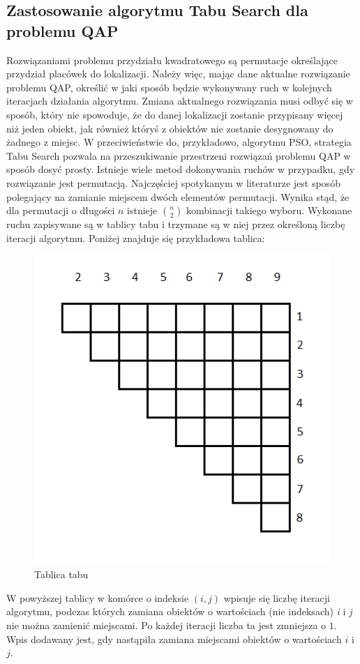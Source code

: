 \subsection{Zastosowanie algorytmu Tabu Search dla problemu QAP}
Rozwiązaniami problemu przydziału kwadratowego są permutacje określające przydział placówek do lokalizacji. Należy więc, mając dane aktualne rozwiązanie problemu QAP, określić w jaki sposób będzie wykonywany ruch w kolejnych iteracjach działania algorytmu. Zmiana aktualnego rozwiązania musi odbyć się w sposób, który nie spowoduje, że do danej lokalizacji zostanie przypisany więcej niż jeden obiekt, jak również któryś z obiektów nie zostanie desygnowany do żadnego z miejsc. W przeciwieństwie do, przykładowo, algorytmu PSO, strategia Tabu Search pozwala na przeszukiwanie przestrzeni rozwiązań problemu QAP w sposób dosyć prosty. Istnieje wiele metod dokonywania ruchów w przypadku, gdy rozwiązanie jest permutacją. Najczęściej spotykanym w literaturze jest sposób polegający na zamianie miejscem dwóch elementów permutacji. Wynika stąd, że dla permutacji o długości $n$ istnieje $n\choose 2$ kombinacji takiego wyboru. Wykonane ruchu zapisywane są w tablicy tabu i trzymane są w niej przez określoną liczbę iteracji algorytmu. Poniżej znajduje się przykładowa tablica:
\newpage
\begin{figure}[h]
\begin{center}
\includegraphics[scale=0.8]{tabu}
\end{center}
\caption{Tablica tabu}
\end{figure}
W powyższej tablicy w komórce o indeksie $(i,j)$ wpisuje się liczbę iteracji algorytmu, podczas których zamiana obiektów o wartościach (nie indeksach) \textit{i} i \textit{j} nie można zamienić miejscami. Po każdej iteracji liczba ta jest zmniejsza o $1$. Wpis dodawany jest, gdy nastąpiła zamiana miejscami obiektów o wartościach $i$ i $j$.


